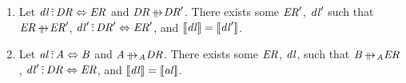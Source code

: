 \documentclass[numbers]{sigplanconf}
\begin{document}
\begin{lemma}
  \label{lem:copyable_expansions_left_swapless}\leavevmode
  \begin{enumerate}
  \item Let $\mathit{dl} \,\tilde{:}\, \mathit{DR} \Leftrightarrow
    \mathit{ER}$ and $\DNFRegex \ParallelRewrite \DNFRegex'$.  There exists some
    $\mathit{ER}'$, $\mathit{dl}'$ such that $\DNFRegexAlt \ParallelRewrite
    \DNFRegexAlt'$,
    $\mathit{dl}' \,\tilde{:}\,
    \mathit{DR}' \Leftrightarrow \mathit{ER}'$, and $[ \! [\mathit{dl}] \! ] =
    [ \! [\mathit{dl}'] \! ]$.
  \item Let $\mathit{al} \,\tilde{:}\, \mathit{A} \Leftrightarrow \mathit{B}$ and
    $\Atom \ParallelRewriteAtom \DNFRegex$.  There exists some $\mathit{ER}$,
    $\mathit{dl}$, such that $\AtomAlt \ParallelRewriteAtom \DNFRegexAlt$,
    $\mathit{dl}' \,\tilde{:}\, \mathit{DR}
    \Leftrightarrow \mathit{ER}$, and $[ \! [\mathit{dl}] \! ] =
    [ \! [\mathit{al}] \! ]$.
  \end{enumerate}
\end{lemma}
\end{document}
